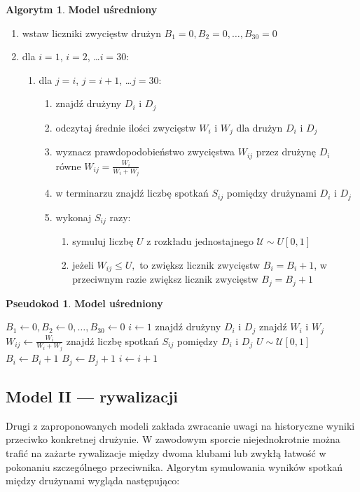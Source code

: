 \documentclass[inzynierska]{pwr_wmat_praca_dyplomowa}
\theoremstyle{plain}
\numberwithin{theorem}{chapter}
\theoremstyle{definition}
\numberwithin{theorem}{chapter}
\newtheorem{algorytm}[theorem]{Algorytm}
\newtheorem{pseudokod}[theorem]{Pseudokod}
\begin{document}
\begin{algorytm} \textbf{Model uśredniony}
	\begin{enumerate}
	\item wstaw liczniki zwycięstw drużyn $B_1= 0,B_2= 0,\dots, B_{30}= 0$
	\item dla $i=1$, $i=2$, \dots $i=30$: 
	\begin{enumerate}
		\item dla $j=i$, $j=i+1$, \dots $j=30$: 
		\begin{enumerate}
			\item znajdź drużyny $D_i$ i $D_j$
		\item odczytaj średnie ilości zwycięstw $W_i$ i $W_j$ dla drużyn $D_i$ i $D_j$ 
		\item wyznacz prawdopodobieństwo zwycięstwa $W_{ij}$ przez drużynę  $D_i$ równe $W_{ij}=\frac{W_i}{W_i + W_j}$   
		\item w terminarzu znajdź liczbę spotkań $S_{ij}$ pomiędzy drużynami $D_i$ i $D_j$
		\item wykonaj $S_{ij}$ razy:
			\begin{enumerate}
				\item symuluj liczbę $U$ z rozkładu jednostajnego $\mathcal{U}\sim U[0,1]$ 
			\item jeżeli $W_{ij} \leq U,$ to zwiększ licznik zwycięstw $B_i=B_i+1$, w przeciwnym razie zwiększ licznik zwycięstw $B_j=B_j+1$
			\end{enumerate}
		\end{enumerate}
	\end{enumerate}
\end{enumerate}
\end{algorytm} 
 
\begin{pseudokod}
	\textbf{Model uśredniony}
	\begin{algorithmic}[1]
		\State $B_1\gets 0,B_2\gets 0,\dots, B_{30}\gets 0$
		\State $i\gets 1$
		\State znajdź drużyny $D_i$ i $D_j$
		\State znajdź $W_i$ i $W_j$ 
		\State $W_{ij}\gets\frac{W_i}{W_i + W_j}$
		\State znajdź liczbę spotkań $S_{ij}$ pomiędzy $D_i$ i $D_j$
		\State $U\sim \mathcal{U}[0,1]$
		\State $B_i \gets B_i+1$
		\Else
		\State $B_j \gets B_j+1$
		\EndIf
		\EndFor
		\EndFor
		\State $i\gets i+1$
		\EndWhile
	\end{algorithmic}
\end{pseudokod}

\subsection{Model II --- rywalizacji}
Drugi z zaproponowanych modeli zakłada zwracanie uwagi na historyczne wyniki przeciwko konkretnej drużynie. W zawodowym sporcie niejednokrotnie można trafić na zażarte rywalizacje między dwoma klubami lub zwykłą łatwość w pokonaniu szczególnego przeciwnika. Algorytm symulowania wyników spotkań między drużynami wygląda następująco:
\end{document}
